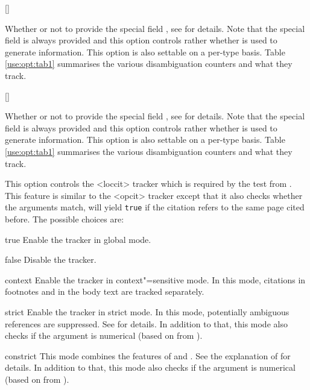 \documentclass{ltxdockit}[2011/03/25]
\begin{document}
\begin{optionlist}
[\BiberOnly]

Whether or not to provide the special field , see  for details. Note that the special field  is always provided and this option controls rather whether  is used to generate  information. This option is also settable on a per-type basis. Table \ref{use:opt:tab1} summarises the various  disambiguation counters and what they track.

[\BiberOnly]

Whether or not to provide the special field , see  for details. Note that the special field  is always provided and this option controls rather whether  is used to generate  information. This option is also settable on a per-type basis. Table \ref{use:opt:tab1} summarises the various  disambiguation counters and what they track.


This option controls the <loccit> tracker which is required by the  test from . This feature is similar to the <opcit> tracker except that it also checks whether the  arguments match, \ie {} will yield \texttt{true} if the citation refers to the same page cited before. The possible choices are:

\begin{valuelist}
\item[true] Enable the tracker in global mode.
\item[false] Disable the tracker.
\item[context] Enable the tracker in context"=sensitive mode. In this mode, citations in footnotes and in the body text are tracked separately.
\item[strict] Enable the tracker in strict mode. In this mode, potentially ambiguous references are suppressed. See  for details. In addition to that, this mode also checks if the  argument is numerical (based on  from ).
\item[constrict] This mode combines the features of  and . See the explanation of  for details. In addition to that, this mode also checks if the  argument is numerical (based on  from ).
\end{valuelist}


\end{optionlist}
\end{document}
